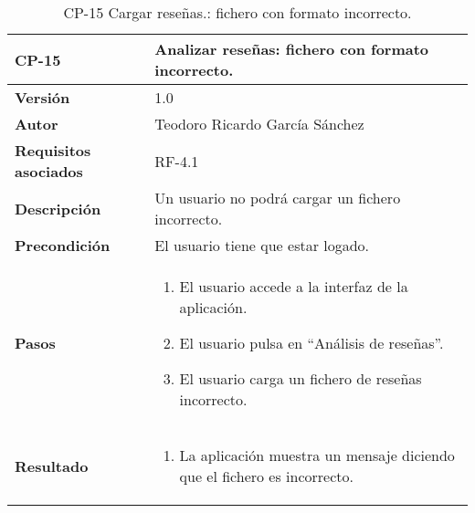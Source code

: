 \begin{table}[p]
	\centering
	\begin{tabularx}{\linewidth}{ p{} p{} }
		\toprule
		\textbf{CP-15}    & \textbf{Analizar reseñas: fichero con formato incorrecto.}\\
		\toprule
		\textbf{Versión}              & 1.0    \\
		\textbf{Autor}                & Teodoro Ricardo García Sánchez \\
		\textbf{Requisitos asociados} & RF-4.1 \\
		\textbf{Descripción}          & Un usuario no podrá cargar un fichero incorrecto. \\
		\textbf{Precondición}         & El usuario tiene que estar logado. \\
		\textbf{Pasos}             &
		\begin{enumerate}
			\def\labelenumi{\arabic{enumi}.}
			\tightlist
			\item El usuario accede a la interfaz de la aplicación.
			\item El usuario pulsa en ``Análisis de reseñas''.
			\item El usuario carga un fichero de reseñas incorrecto.
		\end{enumerate}\\
		\textbf{Resultado}          & 
		\begin{enumerate}
			\item La aplicación muestra un mensaje diciendo que el fichero es incorrecto.
		\end{enumerate}\\
		\bottomrule
	\end{tabularx}
	\caption{CP-15 Cargar reseñas.: fichero con formato incorrecto.}
\end{table}

